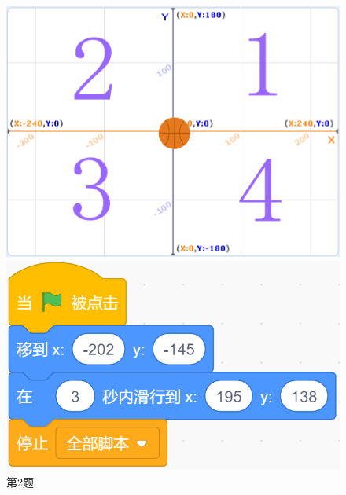 \documentclass[10pt, a4paper]{article}
\begin{document}
\begin{enumerate}
        \begin{figure}[htbp]
            \centering
            \begin{minipage}[t]{.42\textwidth}
                \centering
                \begin{minipage}[t]{.4\textwidth}
                    \centering
                    \includegraphics[width=\textwidth]{2-1.png}
                \end{minipage}
                \begin{minipage}[t]{.52\textwidth}
                    \centering
                    \includegraphics[width=\textwidth]{2-2.png}
                \end{minipage}
                \caption*{第2题}
            \end{minipage}
            \begin{minipage}[t]{.13\textwidth}

\end{minipage}
\end{figure}
\end{enumerate}
\end{document}
